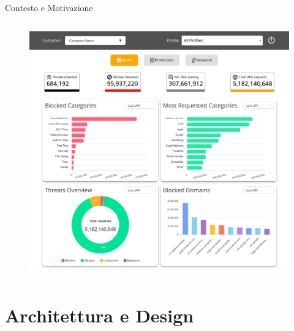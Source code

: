 \documentclass[8pt]{beamer}
\begin{document}
\begin{frame}{Contesto e Motivazione}
\begin{columns}[T]
            \begin{figure}
                \includegraphics[width=\textwidth]{figures/home.png}
            \end{figure}
    \end{columns}
\end{frame}
\section{Architettura e Design}
\end{document}
